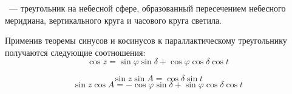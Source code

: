 ~--- треугольник на небесной  сфере, образованный пересечением небесного меридиана, вертикального круга и часового круга светила.

Применив теоремы синусов и косинусов к параллактическому треугольнику получаются следующие соотношения:
\begin{equation}
\cos z=\sin\varphi\sin\delta+\cos\varphi\cos\delta\cos t\end{equation}

\begin{equation}
\sin z\sin A=\cos\delta\sin t
\end{equation}
\begin{equation}
\sin z\cos A=-\cos\varphi\sin\delta+\sin\varphi\cos\delta\cos t
\end{equation}





